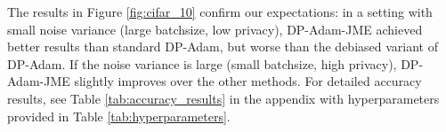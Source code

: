 %
The results in Figure \ref{fig:cifar_10} confirm our expectations:
%
in a setting with small noise variance (large batchsize, low privacy), 
DP-Adam-JME achieved better results than standard DP-Adam, but worse 
than the debiased variant of DP-Adam.
%
If the noise variance is large (small batchsize, high privacy), DP-Adam-JME slightly improves over the other methods.
%
For detailed accuracy results, see Table \ref{tab:accuracy_results} 
in the appendix with hyperparameters provided in Table \ref{tab:hyperparameters}.
%

